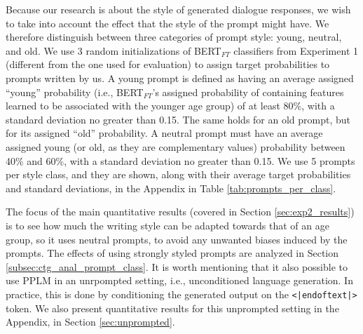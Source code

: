 Because our research is about the style of generated dialogue responses, we wish to take into account the effect that the style of the prompt might have. We therefore distinguish between three categories of prompt style: young, neutral, and old. We use 3 random initializations of BERT$_{FT}$ classifiers from Experiment 1 (different from the one used for evaluation) to assign target probabilities to prompts written by us. A young prompt is defined as having an average assigned ``young'' probability (i.e., BERT$_{FT}$'s assigned probability of containing features learned to be associated with the younger age group) of at least 80\%, with a standard deviation no greater than 0.15. The same holds for an old prompt, but for its assigned ``old'' probability. A neutral prompt must have an average assigned young (or old, as they are complementary values) probability between 40\% and 60\%, with a standard deviation no greater than 0.15. We use 5 prompts per style class, and they are shown, along with their average target probabilities and standard deviations, in the Appendix in Table \ref{tab:prompts_per_class}. 

The focus of the main quantitative results (covered in Section \ref{sec:exp2_results}) is to see how much the writing style can be adapted towards that of an age group, so it uses neutral prompts, to avoid any unwanted biases induced by the prompts. The effects of using strongly styled prompts are analyzed in Section \ref{subsec:ctg_anal_prompt_class}. It is worth mentioning that it also possible to use PPLM in an unrpompted setting, i.e., unconditioned language generation. In practice, this is done by conditioning the generated output on the \texttt{<|endoftext|>} token. We also present quantitative results for this unprompted setting in the Appendix, in Section \ref{sec:unprompted}.

